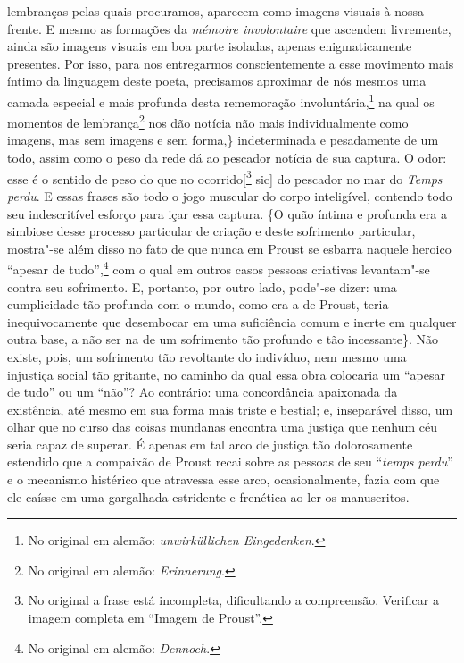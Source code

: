 lembranças pelas quais procuramos, aparecem como imagens visuais à nossa
frente. E mesmo as formações da \emph{mémoire involontaire} que ascendem
livremente, ainda são imagens visuais em boa parte isoladas, apenas
enigmaticamente presentes. Por isso, para nos entregarmos
conscientemente a esse movimento mais íntimo da linguagem deste poeta,
precisamos aproximar de nós mesmos uma camada especial e mais profunda
desta rememoração involuntária,\footnote{No original em alemão:
\emph{unwirküllichen Eingedenken}. \versal{[N. T.]}} na qual os momentos de
lembrança\footnote{No original em alemão: \emph{Erinnerung}. \versal{[N. T.]}} nos dão notícia
não mais individualmente como imagens, mas sem imagens e sem forma,\}
indeterminada e pesadamente de um todo, assim como o peso da rede dá ao
pescador notícia de sua captura. O odor: esse é o sentido de peso do que
no ocorrido{[}\footnote{No original a frase está incompleta,
  dificultando a compreensão. Verificar a imagem completa em ``Imagem de Proust''. \versal{[N. T.]}} sic{]} do pescador no mar do \emph{Temps
perdu}. E essas frases são todo o jogo muscular do corpo inteligível,
contendo todo seu indescritível esforço para içar essa captura. \{O
quão íntima e profunda era a simbiose desse processo particular de
criação e deste sofrimento particular, mostra"-se além disso no fato
de que nunca em Proust se esbarra naquele heroico ``apesar de
tudo'',\footnote{No original em alemão: \emph{Dennoch}. \versal{[N. T.]}} com o qual em outros
casos pessoas criativas levantam"-se contra seu sofrimento. E, portanto, por outro lado,
pode"-se dizer: uma cumplicidade tão profunda com o mundo,
como era a de Proust, teria inequivocamente que desembocar em uma
suficiência comum e inerte em qualquer outra base, a não ser na de um
sofrimento tão profundo e tão incessante\}. Não existe, pois, um
sofrimento tão revoltante do indivíduo, nem mesmo uma injustiça social
tão gritante, no caminho da qual essa obra colocaria um ``apesar de
tudo'' ou um ``não''? Ao contrário: uma concordância apaixonada da
existência, até mesmo em sua forma mais triste e bestial; e, inseparável
disso, um olhar que no curso das coisas mundanas encontra uma justiça
que nenhum céu seria capaz de superar. É apenas em tal arco de justiça
tão dolorosamente estendido que a compaixão de Proust recai
sobre as pessoas de seu ``\emph{temps perdu}'' e o mecanismo histérico
que atravessa esse arco, ocasionalmente, fazia com que ele caísse em uma gargalhada estridente e frenética ao ler os manuscritos.


